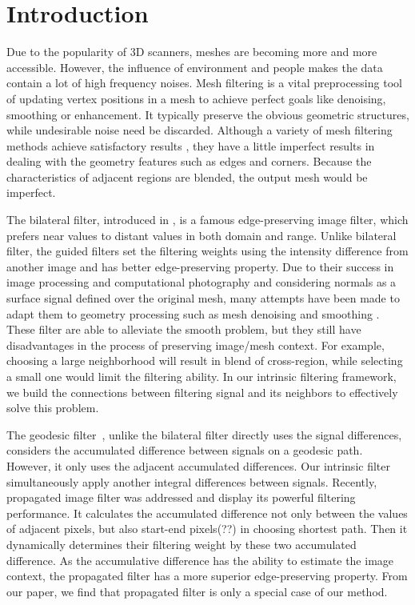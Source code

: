 \section{Introduction}


Due to the popularity of 3D scanners, meshes are becoming more and more accessible.
However, the influence of environment and people makes the data contain a lot of high frequency noises.
Mesh filtering is a vital preprocessing tool of updating vertex positions in a mesh to achieve perfect goals like denoising, smoothing or enhancement.
It typically preserve the obvious geometric structures, while undesirable noise need be discarded.
Although a variety of mesh filtering methods achieve satisfactory results \cite{fleishman2003bilateral, zheng2011bilateral},
they have a little imperfect results in dealing with the geometry features such as edges and corners.
Because the characteristics of adjacent regions are blended, the output mesh would be imperfect.


The bilateral filter, introduced in \cite{tomasi1998bilateral}, is a famous edge-preserving image filter, which prefers near values to distant values in both domain and range.
Unlike bilateral filter, the guided filters \cite{Petschnigg2004, he2010guided} set the filtering weights using the intensity difference from another image and has better edge-preserving property.
Due to their success in image processing and computational photography and considering normals as a surface signal defined over the original mesh,
many attempts have been made to adapt them to geometry processing such as mesh denoising and smoothing \cite{jones2003non, zheng2011bilateral, Solomon2014general}.
These filter are able to alleviate the smooth problem, but they still have disadvantages in the process of preserving image/mesh context.
For example, choosing a large neighborhood will result in blend of cross-region, while selecting a small one would limit the filtering ability.%
In our intrinsic filtering framework, we build the connections between filtering signal and its neighbors to effectively solve this problem.

The geodesic filter~\cite{grazzini2009edge}, unlike the bilateral filter directly uses the signal differences, considers the accumulated difference between signals on a geodesic path.
However, it only uses the adjacent accumulated differences.
Our intrinsic filter simultaneously apply another integral differences between signals.
Recently,  propagated image filter \cite{Chang2015propagated} was addressed and display its powerful filtering performance.
It calculates the accumulated difference not only between the values of adjacent pixels, but also start-end pixels(??) in choosing shortest path.
Then it dynamically determines their filtering weight by these two accumulated difference.
As the accumulative difference has the ability to estimate the image context, the propagated filter has a more superior edge-preserving property.
From our paper, we find that propagated filter is only a special case of our method.

